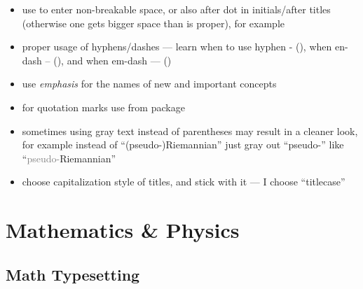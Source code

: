 \begin{itemize}
    \item use \macro{~} to enter non-breakable space, or also after dot in initials/after titles
          (otherwise one gets bigger space than is proper), for example 
    \item proper usage of hyphens/dashes --- learn when to use hyphen - (\macro{-}), when en-dash -- (\macro{--}), and when em-dash --- (\macro{---})
    \item use \emph{emphasis} for the names of new and important concepts
    \item for quotation marks use \macro{\enquote} from  package
    \item sometimes using gray text instead of parentheses may result in a cleaner look, for example instead of \enquote{(pseudo-)Riemannian} just gray out \enquote{pseudo-} like \enquote{\textcolor{gray}{pseudo-}Riemannian}
    \item choose capitalization style of titles, and stick with it --- I choose \enquote{titlecase}
\end{itemize}


\section{Mathematics \& Physics}%
\label{sec:MathematicsandPhysics}

\subsection{Math Typesetting}%
\label{sub:Math Typesetting}


